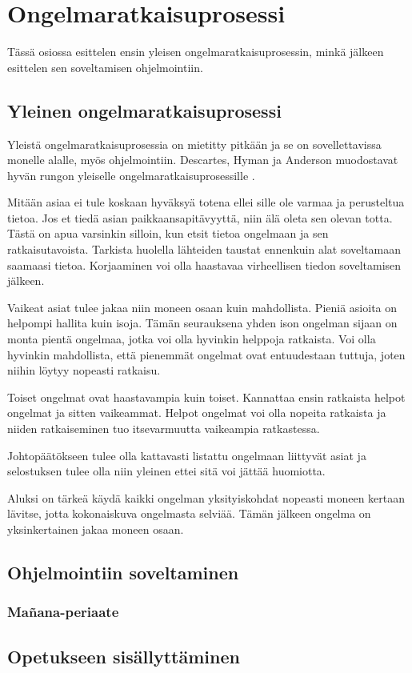 \section{Ongelmaratkaisuprosessi}

Tässä osiossa esittelen ensin yleisen ongelmaratkaisuprosessin, minkä jälkeen
esittelen sen soveltamisen ohjelmointiin.

\subsection{Yleinen ongelmaratkaisuprosessi}

Yleistä ongelmaratkaisuprosessia on mietitty pitkään ja se on sovellettavissa
monelle alalle, myös ohjelmointiin. Descartes, Hyman ja Anderson muodostavat
hyvän rungon yleiselle ongelmaratkaisuprosessille
\cite{Gries:1974:WTI:953057.810447}.

Mitään asiaa ei tule koskaan hyväksyä totena ellei sille ole varmaa ja
perusteltua tietoa. Jos et tiedä asian paikkaansapitävyyttä, niin älä oleta sen
olevan totta. Tästä on apua varsinkin silloin, kun etsit tietoa ongelmaan ja sen
ratkaisutavoista. Tarkista huolella lähteiden taustat ennenkuin alat soveltamaan
saamaasi tietoa. Korjaaminen voi olla haastavaa virheellisen tiedon soveltamisen
jälkeen.

Vaikeat asiat tulee jakaa niin moneen osaan kuin mahdollista. Pieniä asioita on
helpompi hallita kuin isoja. Tämän seurauksena yhden ison ongelman sijaan on
monta pientä ongelmaa, jotka voi olla hyvinkin helppoja ratkaista. Voi olla
hyvinkin mahdollista, että pienemmät ongelmat ovat entuudestaan tuttuja, joten
niihin löytyy nopeasti ratkaisu.

Toiset ongelmat ovat haastavampia kuin toiset. Kannattaa ensin ratkaista helpot
ongelmat ja sitten vaikeammat. Helpot ongelmat voi olla nopeita ratkaista ja
niiden ratkaiseminen tuo itsevarmuutta vaikeampia ratkastessa.

Johtopäätökseen tulee olla kattavasti listattu ongelmaan liittyvät asiat ja
selostuksen tulee olla niin yleinen ettei sitä voi jättää huomiotta.

Aluksi on tärkeä käydä kaikki ongelman yksityiskohdat nopeasti moneen kertaan
lävitse, jotta kokonaiskuva ongelmasta selviää. Tämän jälkeen ongelma on
yksinkertainen jakaa moneen osaan.

\subsection{Ohjelmointiin soveltaminen}

\subsubsection{Mañana-periaate}


\subsection{Opetukseen sisällyttäminen}

